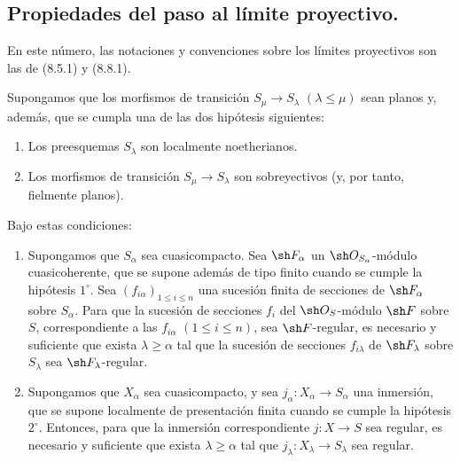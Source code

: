 \subsection{Propiedades del paso al límite proyectivo.}
\label{subsection:IV.19.8}
\label{IV.19.8}

En este número, las notaciones y convenciones sobre los límites proyectivos son las de (8.5.1) y (8.8.1).

\begin{proposition}[19.8.1]
\label{IV.19.8.1}
Supongamos que los morfismos de transición $S_\mu\to S_\lambda$ $(\lambda\leq\mu)$ sean planos y, además, que se cumpla \textup{una} de las dos hipótesis siguientes:
\begin{enumerate}
  \item[$1^\circ$] Los preesquemas $S_\lambda$ son localmente noetherianos.
  \item[$2^\circ$] Los morfismos de transición $S_\mu\to S_\lambda$ son sobreyectivos (y, por tanto, fielmente planos).
\end{enumerate}


Bajo estas condiciones:
\begin{enumerate}
  \item[\textup{(i)}] Supongamos que $S_\alpha$ sea cuasicompacto. Sea $\sh F_\alpha$ un $\sh O_{S_\alpha}$-módulo cuasicoherente, que se supone además de tipo finito cuando se cumple la hipótesis $1^\circ$. Sea $(f_{i\alpha})_{1\leq i\leq n}$ una sucesión finita de secciones de $\sh F_\alpha$ sobre $S_\alpha$. Para que la sucesión de secciones $f_i$ del $\sh O_S$-módulo $\sh F$ sobre $S$, correspondiente a las $f_{i\alpha}$ $(1\leq i\leq n)$, sea $\sh F$-regular, es necesario y suficiente que exista $\lambda\geq\alpha$ tal que la sucesión de secciones $f_{i\lambda}$ de $\sh F_\lambda$ sobre $S_\lambda$ sea $\sh F_\lambda$-regular.
  \item[\textup{(ii)}] Supongamos que $X_\alpha$ sea cuasicompacto, y sea $j_\alpha:X_\alpha\to S_\alpha$ una inmersión, que se supone localmente de presentación finita cuando se cumple la hipótesis $2^\circ$. Entonces, para que la inmersión correspondiente $j:X\to S$ sea regular, es necesario y suficiente que exista $\lambda\geq\alpha$ tal que $j_\lambda:X_\lambda\to S_\lambda$ sea regular.
\end{enumerate}
\end{proposition}

